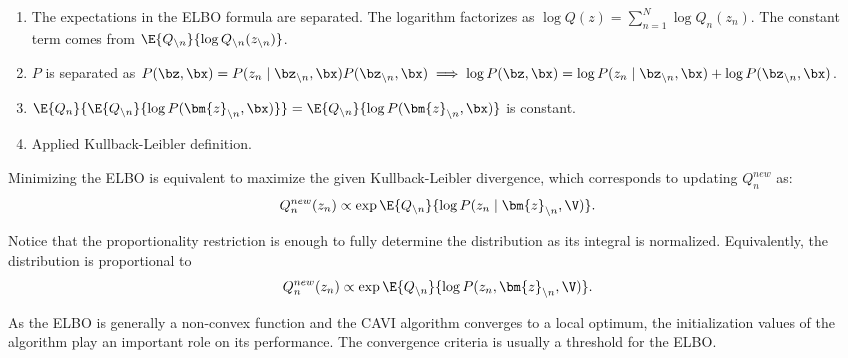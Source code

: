 \begin{enumerate}
  \item The expectations in the ELBO formula are separated. The logarithm factorizes as \(\log Q(z) = \sum_{n=1}^N \log Q_n(z_n)\).  The constant term comes from \( \E{Q_{\backslash n}}{\log Q_{\backslash n}(z_{\backslash n})} \).
  \item \( P \) is separated as \( P(\bz, \bx) = P(z_n \mid \bz_{\backslash n}, \bx)P(\bz_{\backslash n}, \bx) \implies \log P(\bz, \bx) = \log P(z_n \mid \bz_{\backslash n}, \bx) + \log P(\bz_{\backslash n}, \bx)\).
  \item \( \E{Q_{n}}{\E{Q_{\backslash n}}{\log{P(\bm{z}_{\backslash n}, \bx)}}} = \E{Q_{\backslash n}}{\log{P(\bm{z}_{\backslash n}, \bx)}}\) is constant.
  \item Applied Kullback-Leibler definition.
\end{enumerate}

Minimizing the ELBO is equivalent to maximize the given Kullback-Leibler divergence, which corresponds to updating \(Q_{n}^{new}\) as:
\[
  Q_{n}^{new}(z_{n}) \propto \exp{\E{Q_{\backslash n}}{\log{P(z_{n} \mid \bm{z}_{\backslash n}, \V)}}}.
\]

Notice that the proportionality restriction is enough to fully determine the distribution as its integral is normalized. Equivalently, the distribution is proportional to
\[
    Q_{n}^{new}(z_{n}) \propto \exp{\E{Q_{\backslash n}}{\log{P(z_{n}, \bm{z}_{\backslash n}, \V)}}}.
\]

As the ELBO is generally a non-convex function and the CAVI algorithm converges to a local optimum, the initialization values of the algorithm play an important role on its performance.
The convergence criteria is usually a threshold for the ELBO.
